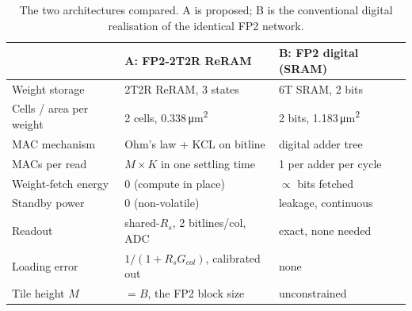 \begin{table}[t]
\centering
\caption{The two architectures compared. A is proposed; B is the conventional digital realisation of the identical FP2 network.}
\label{tab:architectures}
\begin{tabular}{lll}
\toprule
 & \textbf{A: FP2-2T2R ReRAM} & \textbf{B: FP2 digital (SRAM)} \\
\midrule
Weight storage & 2T2R ReRAM, 3 states & 6T SRAM, 2 bits \\
Cells / area per weight & 2 cells, 0.338\,\si{\micro\meter\squared} & 2 bits, 1.183\,\si{\micro\meter\squared} \\
MAC mechanism & Ohm's law + KCL on bitline & digital adder tree \\
MACs per read & $M\times K$ in one settling time & 1 per adder per cycle \\
Weight-fetch energy & 0 (compute in place) & $\propto$ bits fetched \\
Standby power & 0 (non-volatile) & leakage, continuous \\
Readout & shared-$R_s$, 2 bitlines/col, ADC & exact, none needed \\
Loading error & $1/(1+R_sG_{col})$, calibrated out & none \\
Tile height $M$ & $=B$, the FP2 block size & unconstrained \\
\bottomrule
\end{tabular}
\end{table}
